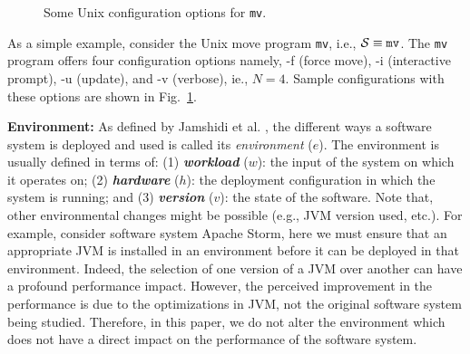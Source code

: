 \documentclass[10pt,journal,compsoc]{IEEEtran}
\newcommand{\fig}[1]{Fig.~\ref{fig:#1}}
\begin{document}
\begin{figure}
    \scriptsize \centering
    \caption{Some Unix  configuration options for  \texttt{mv}.}
    \label{fig:sample_config}
\end{figure}
As a simple example, consider the Unix move program \texttt{mv}, i.e., $\mathcal{S}\equiv\text{\texttt{mv}}$. The \texttt{mv} program offers four configuration options namely, -f (force move), -i    (interactive prompt), -u (update), and -v (verbose), ie., $N=4$. Sample configurations with these options are shown in \fig{sample_config}. %




\noindent\textbf{Environment: }
As defined by Jamshidi et al. \cite{jamshidi2017transfer2}, 
the different ways
a software system
is deployed and used is called its
  {\em environment} ($e$). 
The environment is usually defined in terms of: (1) \textbf{\textit{workload}} ($w$): the input of the system 
on which it operates on; (2) \textbf{\textit{hardware}} ($h$): the deployment configuration in 
which the system is running; and (3) \textbf{\textit{version}} ($v$): the state of the 
software. 
Note that, other environmental changes might be possible (e.g., JVM version used, etc.). For example, consider software system Apache Storm, here
we must ensure that an appropriate JVM is installed in an environment before it can be deployed in that environment. Indeed, the selection of one version of 
a JVM over another can have a profound performance impact. However, the perceived improvement in the performance is due to the optimizations in JVM, not the original software system being studied.  Therefore, in this paper, we do not alter the environment which does not have a direct impact on the performance of the software system. 
\end{document}
